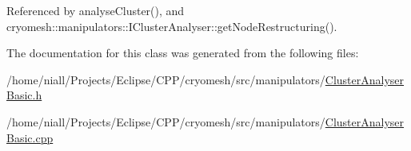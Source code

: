 \-Referenced by analyse\-Cluster(), and cryomesh\-::manipulators\-::\-I\-Cluster\-Analyser\-::get\-Node\-Restructuring().



\-The documentation for this class was generated from the following files\-:\begin{DoxyCompactItemize}
\item 
/home/niall/\-Projects/\-Eclipse/\-C\-P\-P/cryomesh/src/manipulators/\hyperlink{ClusterAnalyserBasic_8h}{\-Cluster\-Analyser\-Basic.\-h}\item 
/home/niall/\-Projects/\-Eclipse/\-C\-P\-P/cryomesh/src/manipulators/\hyperlink{ClusterAnalyserBasic_8cpp}{\-Cluster\-Analyser\-Basic.\-cpp}\end{DoxyCompactItemize}
